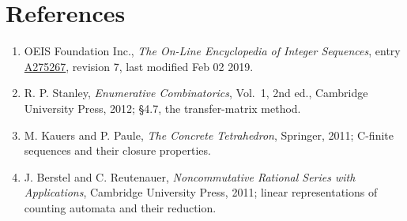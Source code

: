 \documentclass[11pt]{article}
\theoremstyle{definition}
\begin{document}
\section{References}

\begin{enumerate}

\item OEIS Foundation Inc., \emph{The On-Line Encyclopedia of Integer Sequences}, entry \href{https://oeis.org/A275267}{A275267}, revision 7, last modified Feb 02 2019.

\item R. P. Stanley, \emph{Enumerative Combinatorics}, Vol.~1, 2nd ed., Cambridge University Press, 2012; \S4.7, the transfer-matrix method.

\item M. Kauers and P. Paule, \emph{The Concrete Tetrahedron}, Springer, 2011; C-finite sequences and their closure properties.

\item J. Berstel and C. Reutenauer, \emph{Noncommutative Rational Series with Applications}, Cambridge University Press, 2011; linear representations of counting automata and their reduction.

\end{enumerate}
\end{document}
